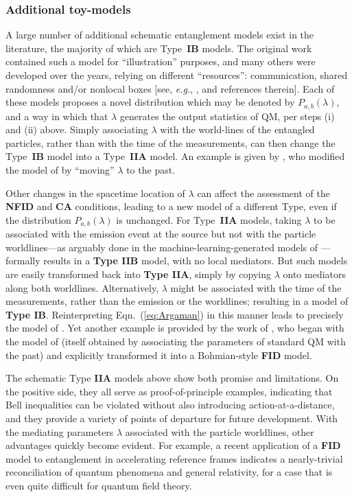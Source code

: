 \documentclass[onecolumn, nofootinbib, 12pt]{revtex4-1}
\begin{document}
\subsubsection{Additional toy-models}
\label{sec:more_toys}

A large number of additional schematic entanglement models exist in the literature, the majority of which are Type~{\bf IB} models.  The original \textcite{bell1964} work contained such a model for ``illustration'' purposes, and many others were developed over the years, relying on different ``resources'': communication, shared randomness and/or nonlocal boxes [see, \emph{e.g.}, \textcite{degorre2005}, and references therein].  Each of these models proposes a novel distribution which may be denoted by $P_{a,b}(\lambda)$, and a way in which that $\lambda$ generates the output statistics of QM, per steps (i) and (ii) above.  Simply associating $\lambda$ with the world-lines of the entangled particles, rather than with the time of the measurements, can then change the Type~{\bf IB} model into a Type~{\bf IIA} model.  An example is given by \textcite{barrett2011}, who modified the model of \textcite{toner2003,degorre2005} by ``moving'' $\lambda$ to the past.

Other changes in the spacetime location of $\lambda$ can affect the assessment of the {\bf NFID} and {\bf CA} conditions, leading to a new model of a different Type, even if the distribution $P_{a,b}(\lambda)$ is unchanged.  For Type~{\bf IIA} models, taking $\lambda$ to be associated with the emission event at the source but not with the particle worldlines---as arguably done in the machine-learning-generated models of \textcite{weinstein2017,weinstein2018}---formally results in a {\bf Type IIB} model, with no local mediators.  But such models are easily transformed back into {\bf Type IIA}, simply by copying $\lambda$ onto mediators along both worldlines.  Alternatively, $\lambda$ might be associated with the time of the measurements, rather than the emission or the worldlines; resulting in a model of {\bf Type IB}.  Reinterpreting Eqn.~(\ref{eq:Argaman}) in this manner leads to precisely the model of \textcite{dilorenzo2012}.  Yet another example is provided by the work of \textcite{sen2018}, who began with the model of \textcite{brans1988} (itself obtained by associating the parameters of standard QM with the past) and explicitly transformed it into a Bohmian-style {\bf FID} model.

The schematic Type {\bf IIA} models above show both promise and limitations.  On the positive side, they all serve as proof-of-principle examples, indicating that Bell inequalities can be violated without also introducing action-at-a-distance, and they provide a variety of points of departure for future development.  With the mediating parameters $\lambda$ associated with the particle worldlines, other advantages quickly become evident.  For example, a recent application \cite{sen2019} of a {\bf FID} model to entanglement in accelerating reference frames indicates a nearly-trivial reconciliation of quantum phenomena and general relativity, for a case that is even quite difficult for quantum field theory.  
\end{document}
